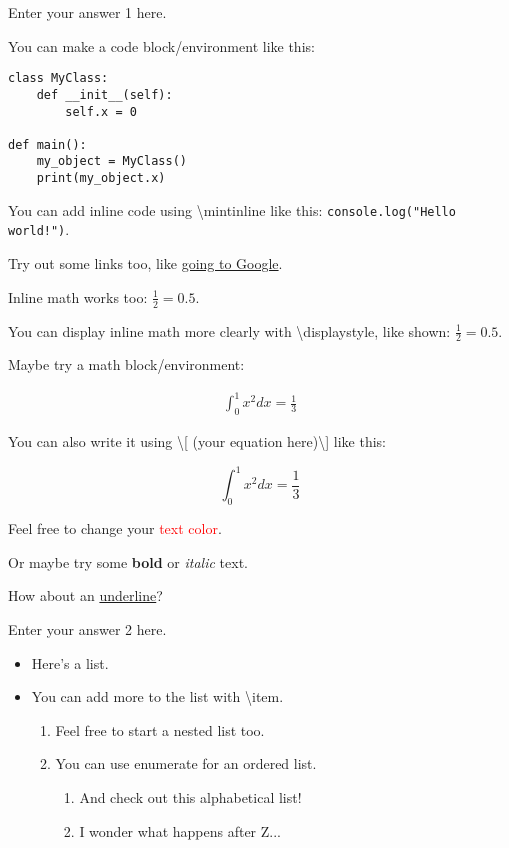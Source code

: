 \documentclass[11pt]{awe-homework}
\begin{document}
\makeheader

Enter your answer 1 here.

You can make a code block/environment like this:
\begin{verbatim}
class MyClass:
    def __init__(self):
        self.x = 0

def main():
    my_object = MyClass()
    print(my_object.x)
\end{verbatim}

You can add inline code using \textbackslash mintinline like this: \texttt{console.log("Hello world!")}.

Try out some links too, like \href{https://google.com}{going to Google}.

Inline math works too: $\frac{1}{2} = 0.5$.

You can display inline math more clearly with \textbackslash{displaystyle}, like shown: $\displaystyle\frac{1}{2} = 0.5$.

Maybe try a math block/environment:

$$
\begin{aligned}
    \int_0^1 x^2 dx = \frac{1}{3}
\end{aligned}
$$

You can also write it using \textbackslash [ (your equation here)\textbackslash ] like this:

\[ \int_0^1 x^2 dx = \frac{1}{3} \]

Feel free to change your \textcolor{red}{text color}.

Or maybe try some \textbf{bold} or \textit{italic} text.

How about an \underline{underline}?

Enter your answer 2 here.
\begin{itemize}
    \item Here's a list.
    \item You can add more to the list with \textbackslash item.
    \begin{enumerate}
        \item Feel free to start a nested list too.
        \item You can use enumerate for an ordered list.
        \begin{enumerate}[label=(\alph*)]
            \item And check out this alphabetical list!
            \item I wonder what happens after Z...
        \end{enumerate}
    \end{enumerate}
\end{itemize}
\end{document}
